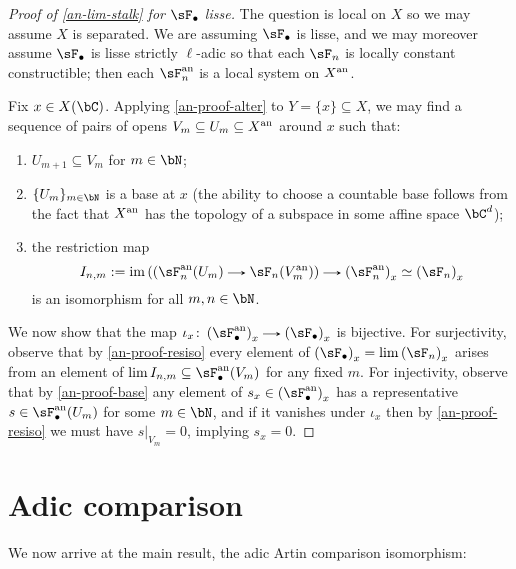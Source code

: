 \begin{nothing}
  \begin{proof}[Proof of \cref{an-lim-stalk} for $\sF_\bullet$ lisse]
    The question is local on $X$ so we may assume $X$ is separated. We are assuming $\sF_\bullet$ is lisse, and we may moreover assume $\sF_\bullet$ is lisse strictly $\ell$-adic so that each $\sF_n$ is locally constant constructible; then each $\sF_n^\an$ is a local system on $X^{\mathrm{an}}$.

    Fix $x \in X(\bC)$. Applying \cref{an-proof-alter} to $Y = \{x\} \subseteq X$, we may find a sequence of pairs of opens $V_m \subseteq U_m \subseteq X^{\mathrm{an}}$ around $x$ such that:
    \begin{enumerate}
    \item $U_{m+1} \subseteq V_m$ for $m \in \bN$;
    \item \label{an-proof-base} $\{U_m\}_{m \in \bN}$ is a base at $x$ (the ability to choose a countable base follows from the fact that $X^{\mathrm{an}}$ has the topology of a subspace in some affine space $\bC^d$);
    \item \label{an-proof-resiso} the restriction map
      \[
        I_{n,m} \ce \im\l((\sF_n^\an(U_m) \to \sF_n(V_m^\an)\r) \to \l(\sF_n^\an\r)_x \iso \l(\sF_n\r)_x
      \]
      is an isomorphism for all $m,n \in \bN$.
    \end{enumerate}
    
    We now show that the map $\iota_x \c \l(\sF_\bullet^\an\r)_x \to \l(\sF_\bullet\r)_x$ is bijective. For surjectivity, observe that by \cref{an-proof-resiso} every element of $\l(\sF_\bullet\r)_x = \lim {\l(\sF_n\r)_x}$ arises from an element of $\lim I_{n,m} \subseteq \sF_\bullet^\an(V_m)$ for any fixed $m$. For injectivity, observe that by \cref{an-proof-base} any element of $s_x \in \l(\sF_\bullet^\an\r)_x$ has a representative $s \in \sF_\bullet^\an(U_m)$ for some $m \in \bN$, and if it vanishes under $\iota_x$ then by \cref{an-proof-resiso} we must have $s|_{V_m} = 0$, implying $s_x = 0$.
  \end{proof}
\end{nothing}


\section{Adic comparison}
\label{comp}

We now arrive at the main result, the adic Artin comparison isomorphism:

